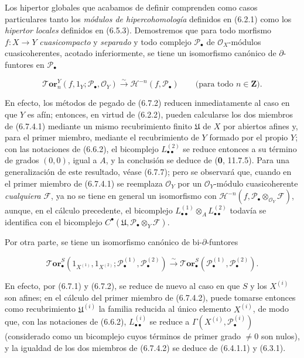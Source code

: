 \begin{remark}[6.7.4]
\label{III.6.7.4}
Los hipertor globales que acabamos de definir comprenden como casos
particulares tanto los \emph{módulos de hipercohomología} definidos en
(6.2.1) como los \emph{hipertor locales} definidos en (6.5.3). Demostremos que
para todo morfismo $f:X\to Y$ \emph{cuasicompacto} y \emph{separado} y todo complejo
$\mathscr P_\bullet$ de $\mathscr O_X$-módulos cuasicoherentes, acotado
inferiormente, se tiene un isomorfismo canónico de $\partial$-funtores en
$\mathscr P_\bullet$

\label{III.6.7.4.1}
\[
  \boldsymbol{\mathscr{T}\!or}_n^Y(f,1_Y;\mathscr P_\bullet,\mathscr O_Y)
  \xrightarrow{\sim}
  \mathcal H^{-n}(f,\mathscr P_\bullet)
  \qquad\text{(para todo $n\in\mathbf Z$)}.
  \tag{6.7.4.1}\label{III.6.7.4.1.fr}
\]

En efecto, los métodos de pegado de (6.7.2) reducen inmediatamente al caso en
que $Y$ es afín; entonces, en virtud de (6.2.2), pueden calcularse los dos
miembros de (6.7.4.1) mediante un mismo recubrimiento finito $\mathfrak U$ de
$X$ por abiertos afines y, para el primer miembro, mediante el recubrimiento de
$Y$ formado por el propio $Y$; con las notaciones de (6.6.2), el bicomplejo
$L_{\bullet\bullet}^{(2)}$ se reduce entonces a su término de grados $(0,0)$,
igual a $A$, y la conclusión se deduce de (\textbf{0}, 11.7.5). Para una
generalización de este resultado, véase (6.7.7); pero se observará que, cuando en
el primer miembro de (6.7.4.1) se reemplaza $\mathscr O_Y$ por un
$\mathscr O_Y$-módulo cuasicoherente \emph{cualquiera} $\mathscr F$, ya no
se tiene en general un isomorfismo con
$\mathcal H^{-n}(f,\mathscr P_\bullet\otimes_{\mathscr O_Y}\mathscr F)$,
aunque, en el cálculo precedente, el bicomplejo
$L_{\bullet\bullet}^{(1)}\otimes_A L_{\bullet\bullet}^{(2)}$ todavía se
identifica con el bicomplejo
$C^\bullet(\mathfrak U,\mathscr P_\bullet\otimes_Y\mathscr F)$.

Por otra parte, se tiene un isomorfismo canónico de
bi-$\partial$-funtores

\label{III.6.7.4.2}
\[
  \boldsymbol{\mathscr{T}\!or}_\bullet^S
  (1_{X^{(1)}},1_{X^{(2)}};
   \mathscr P_\bullet^{(1)},\mathscr P_\bullet^{(2)})
  \xrightarrow{\sim}
  \boldsymbol{\mathscr{T}\!or}_\bullet^S
  (\mathscr P_\bullet^{(1)},\mathscr P_\bullet^{(2)}).
  \tag{6.7.4.2}\label{III.6.7.4.2.fr}
\]

En efecto, por (6.7.1) y (6.7.2), se reduce de nuevo al caso en que $S$ y
los $X^{(i)}$ son afines; en el cálculo del primer miembro de (6.7.4.2), puede
tomarse entonces como
recubrimiento $\mathfrak U^{(i)}$ la familia reducida al
único elemento $X^{(i)}$, de modo que, con las notaciones de (6.6.2),
$L_{\bullet\bullet}^{(i)}$ se reduce a
$\Gamma(X^{(i)},\mathscr P_\bullet^{(i)})$ (considerado como un bicomplejo
cuyos términos de primer grado $\ne0$ son nulos), y la igualdad de los dos
miembros de (6.7.4.2) se deduce de (6.4.1.1) y (6.3.1).
\end{remark}

